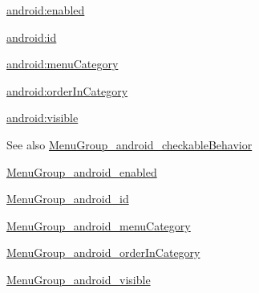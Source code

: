 {\ttfamily \hyperlink{classandroid_1_1support_1_1v4_1_1R_1_1styleable_a0ef41259de1dde6c511a4b586a9a393d}{android\+:enabled}}

{\ttfamily \hyperlink{classandroid_1_1support_1_1v4_1_1R_1_1styleable_a4991b9572aa5383361a4a0898b840fb6}{android\+:id}}

{\ttfamily \hyperlink{classandroid_1_1support_1_1v4_1_1R_1_1styleable_a1c7a436a1a116da0d50730f4f6d23476}{android\+:menu\+Category}}

{\ttfamily \hyperlink{classandroid_1_1support_1_1v4_1_1R_1_1styleable_a63ffd78acd037e7733c69b1130737dff}{android\+:order\+In\+Category}}

{\ttfamily \hyperlink{classandroid_1_1support_1_1v4_1_1R_1_1styleable_ac3db0cd59a9a1fe7f84c406651350dbe}{android\+:visible}}

\begin{DoxySeeAlso}{See also}
\hyperlink{classandroid_1_1support_1_1v4_1_1R_1_1styleable_a3fb026c5081357018f4b79cc18961297}{Menu\+Group\+\_\+android\+\_\+checkable\+Behavior} 

\hyperlink{classandroid_1_1support_1_1v4_1_1R_1_1styleable_a0ef41259de1dde6c511a4b586a9a393d}{Menu\+Group\+\_\+android\+\_\+enabled} 

\hyperlink{classandroid_1_1support_1_1v4_1_1R_1_1styleable_a4991b9572aa5383361a4a0898b840fb6}{Menu\+Group\+\_\+android\+\_\+id} 

\hyperlink{classandroid_1_1support_1_1v4_1_1R_1_1styleable_a1c7a436a1a116da0d50730f4f6d23476}{Menu\+Group\+\_\+android\+\_\+menu\+Category} 

\hyperlink{classandroid_1_1support_1_1v4_1_1R_1_1styleable_a63ffd78acd037e7733c69b1130737dff}{Menu\+Group\+\_\+android\+\_\+order\+In\+Category} 

\hyperlink{classandroid_1_1support_1_1v4_1_1R_1_1styleable_ac3db0cd59a9a1fe7f84c406651350dbe}{Menu\+Group\+\_\+android\+\_\+visible} 
\end{DoxySeeAlso}
\mbox{\label{classandroid_1_1support_1_1v4_1_1R_1_1styleable_a3fb026c5081357018f4b79cc18961297}} 
